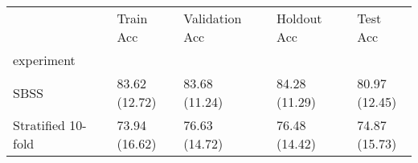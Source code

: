\begin{table}
\centering
\label{tab:sbss_no_sbss}
\begin{tabular}{lllll}
\toprule
{} &      Train Acc & Validation Acc &    Holdout Acc &       Test Acc \\
experiment         &                &                &                &                \\
\midrule
SBSS               &  \makecell{83.62\\(12.72)} &  \makecell{83.68\\(11.24)} &  \makecell{84.28\\(11.29)} &  \makecell{80.97\\(12.45)} \\
Stratified 10-fold &  \makecell{73.94\\(16.62)} &  \makecell{76.63\\(14.72)} &  \makecell{76.48\\(14.42)} &  \makecell{74.87\\(15.73)} \\
\bottomrule
\end{tabular}
\end{table}
